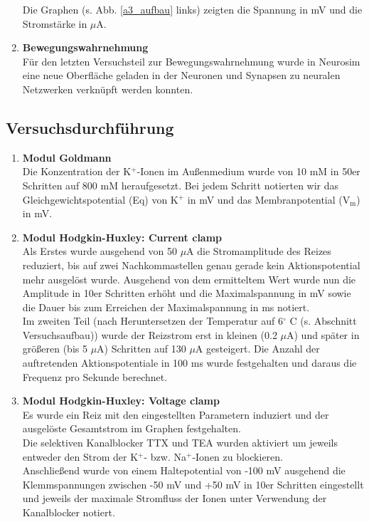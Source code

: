\documentclass[11pt]{article}
\begin{document}
\begin{enumerate}
Die Graphen (s. Abb. \ref{a3_aufbau} links) zeigten die Spannung in mV und die Stromstärke in $\mu$A.

\item \textbf{Bewegungswahrnehmung} \\
Für den letzten Versuchsteil zur Bewegungswahrnehmung wurde in Neurosim eine neue Oberfläche geladen in der Neuronen und Synapsen zu neuralen Netzwerken verknüpft werden konnten.
\end{enumerate}

\subsection{Versuchsdurchführung}
\begin{enumerate}
\item \textbf{Modul Goldmann} \\
Die Konzentration der K$^+$-Ionen im Außenmedium wurde von 10 mM in 50er Schritten auf 800 mM heraufgesetzt. Bei jedem Schritt notierten wir das Gleichgewichtspotential (Eq) von K$^+$ in mV und das Membranpotential (V$_\text{m}$) in mV.

\item \textbf{Modul Hodgkin-Huxley: Current clamp}\\
Als Erstes wurde ausgehend von 50 $\mu$A die Stromamplitude des Reizes reduziert, bis auf zwei Nachkommastellen genau gerade kein Aktionspotential mehr ausgelöst wurde. Ausgehend von dem ermitteltem Wert wurde nun die Amplitude in 10er Schritten erhöht und die Maximalspannung in mV sowie die Dauer bis zum Erreichen der Maximalspannung in ms notiert.\\

Im zweiten Teil (nach Heruntersetzen der Temperatur auf 6$^\circ$ C (s. Abschnitt Versuchsaufbau)) wurde der Reizstrom erst in kleinen (0.2 $\mu$A) und später in größeren (bis 5 $\mu$A) Schritten auf 130 $\mu$A gesteigert. Die Anzahl der auftretenden Aktionspotentiale in 100 ms wurde festgehalten und daraus die Frequenz pro Sekunde berechnet.

\item \textbf{Modul Hodgkin-Huxley: Voltage clamp}\\
Es wurde ein Reiz mit den eingestellten Parametern induziert und der ausgelöste Gesamtstrom im Graphen festgehalten.\\
Die selektiven Kanalblocker TTX und TEA wurden aktiviert um jeweils entweder den Strom der K$^+$- bzw. Na$^+$-Ionen zu blockieren.\\
Anschließend wurde von einem Haltepotential von -100 mV ausgehend die Klemmspannungen zwischen -50 mV und +50 mV in 10er Schritten eingestellt und jeweils der maximale Stromfluss der Ionen unter Verwendung der Kanalblocker notiert.


\end{enumerate}
\end{document}
